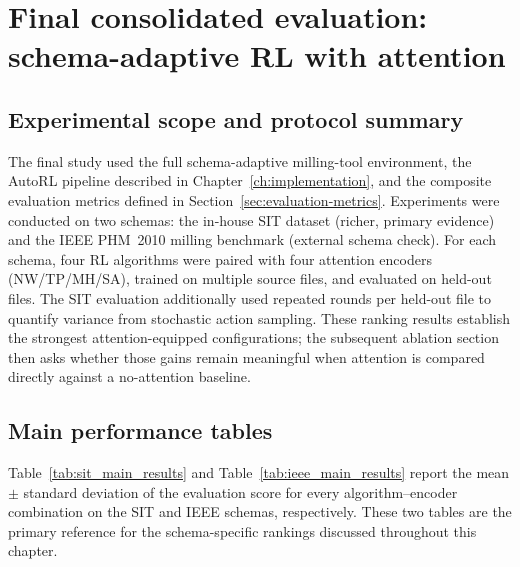 \documentclass[12pt,oneside]{book}
\begin{document}

\section{Final consolidated evaluation: schema-adaptive RL with attention}\label{sec:results-final}
\subsection{Experimental scope and protocol summary}
The final study used the full schema-adaptive milling-tool environment, the AutoRL pipeline described in Chapter~\ref{ch:implementation}, and the composite evaluation metrics defined in Section~\ref{sec:evaluation-metrics}. Experiments were conducted on two schemas: the in-house SIT dataset (richer, primary evidence) and the IEEE PHM~2010 milling benchmark (external schema check). For each schema, four RL algorithms were paired with four attention encoders (NW/TP/MH/SA), trained on multiple source files, and evaluated on held-out files. The SIT evaluation additionally used repeated rounds per held-out file to quantify variance from stochastic action sampling. These ranking results establish the strongest attention-equipped configurations; the subsequent ablation section then asks whether those gains remain meaningful when attention is compared directly against a no-attention baseline.

\subsection{Main performance tables}
Table~\ref{tab:sit_main_results} and Table~\ref{tab:ieee_main_results} report the mean $\pm$ standard deviation of the evaluation score for every algorithm--encoder combination on the SIT and IEEE schemas, respectively. These two tables are the primary reference for the schema-specific rankings discussed throughout this chapter.
\end{document}
